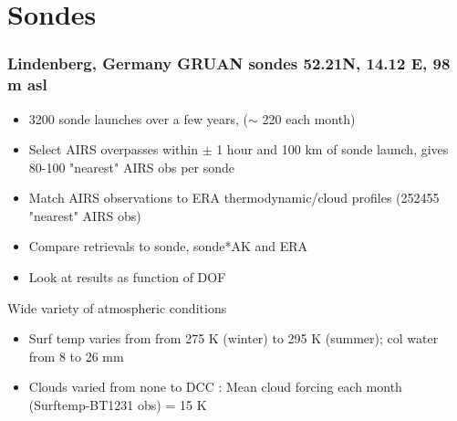 \documentclass[10pt,t]{beamer}
\begin{document}
\section{Sondes}
\begin{frame}
  \frametitle{Lindenberg, Germany GRUAN sondes \newline 52.21N, 14.12 E, 98
    m asl}

  \begin{itemize}
  \item 3200 sonde launches over a few years, ($\sim$ 220 each month)
  \item Select AIRS overpasses within $\pm$ 1 hour and 100 km of sonde
    launch, gives 80-100 "nearest" AIRS obs per sonde
  \item Match AIRS observations to ERA thermodynamic/cloud profiles (252455
    "nearest" AIRS obs)
  \item Compare retrievals to sonde, sonde*AK and ERA
  \item Look at results as function of DOF
  \end{itemize}

  \vspace{0.125in} Wide variety of atmospheric conditions
  \begin{itemize}
  \item Surf temp varies from from 275 K (winter) to 295 K (summer); col
    water from 8 to 26 mm
  \item Clouds varied from none to DCC : Mean cloud forcing each month
    (Surftemp-BT1231 obs) = 15 K
  \end{itemize}
\end{frame}
\end{document}
